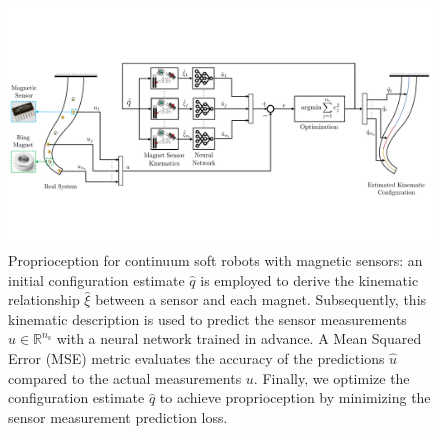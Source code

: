 \begin{figure}[ht]
  \centering
  \includegraphics[width=1.0\textwidth]{promasens/figures/methodology/methodology_proprioception_v8_compressed.pdf}
  \caption{Proprioception for continuum soft robots with magnetic sensors: an initial configuration estimate $\hat{q}$ is employed to derive the kinematic relationship $\hat{\xi}$ between a sensor and each magnet. Subsequently, this kinematic description is used to predict the sensor measurements $\hat{u} \in \mathbb{R}^{n_\mathrm{s}}$ with a neural network trained in advance. A Mean Squared Error (MSE) metric evaluates the accuracy of the predictions $\hat{u}$ compared to the actual measurements $u$. Finally, we optimize the configuration estimate $\hat{q}$ to achieve proprioception by minimizing the sensor measurement prediction loss.}\label{fig:promasens:methodology}
\end{figure}




